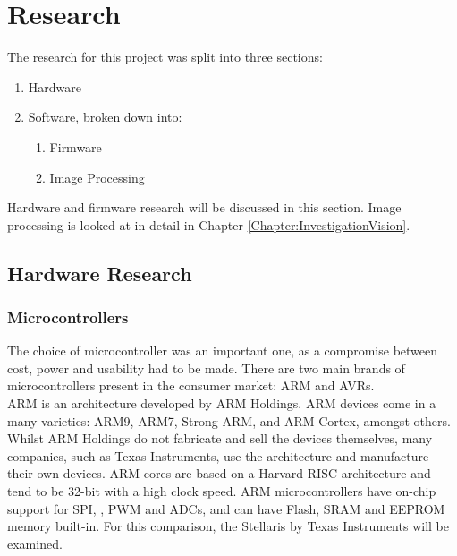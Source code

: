 \chapter{Research} \label{Chapter:Research}
The research for this project was split into three sections:
\begin{enumerate}
\item Hardware
\item Software, broken down into:
\begin{enumerate}
\item Firmware
\item Image Processing
\end{enumerate}
\end{enumerate}

Hardware and firmware research will be discussed in this section. Image processing is looked at in detail in Chapter \ref{Chapter:InvestigationVision}.
\section{Hardware Research}\label{Research:Hardware}
\subsection{Microcontrollers}\label{Research:Microcontrollers}
The choice of microcontroller was an important one, as a compromise between cost, power and usability had to be made. There are two main brands of microcontrollers present in the consumer market: ARM and AVRs.\\ %

ARM is an architecture developed by ARM Holdings. ARM devices come in a many varieties: ARM9, ARM7, Strong ARM, and ARM Cortex, amongst others. Whilst ARM Holdings do not fabricate and sell the devices themselves, many companies, such as Texas Instruments, use the architecture and manufacture their own devices. ARM cores are based on a Harvard RISC architecture and tend to be 32-bit with a high clock speed. ARM microcontrollers have on-chip support for SPI, \itc, PWM and ADCs, and can have Flash, SRAM and EEPROM memory built-in. For this comparison, the Stellaris by Texas Instruments will be examined. 

